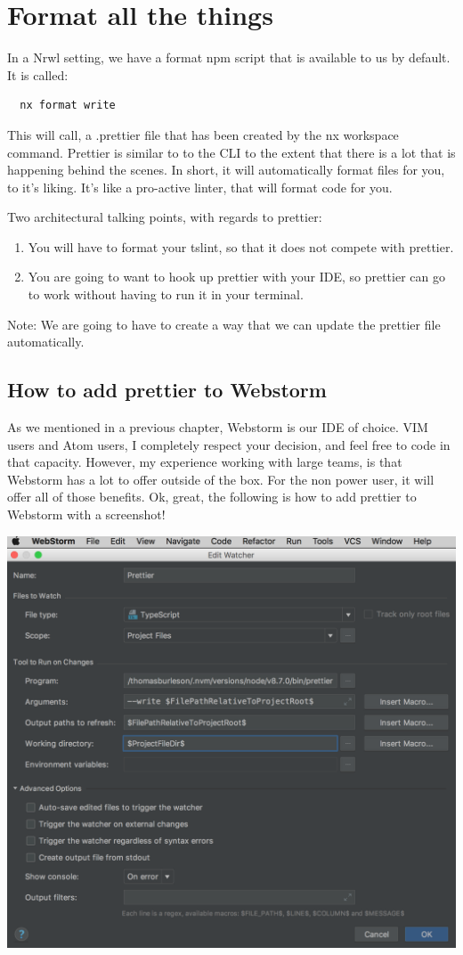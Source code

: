 
\chapter{ Format all the things }

In a Nrwl setting, we have a format npm script that is available to us by default.
It is called:

\begin{verbatim}
  nx format write
\end{verbatim}

This will call, a .prettier file that has been created by the nx workspace
command. Prettier is similar to to the CLI to the extent that there is a lot
that is happening behind the scenes. In short, it will automatically format files
for you, to it's liking. It's like a pro-active linter, that will format code
for you.

Two architectural talking points, with regards to prettier:
\begin{enumerate}
  \item You will have to format your tslint, so that it does not compete with prettier.
  \item You are going to want to hook up prettier with your IDE, so prettier
  can go to work without having to run it in your terminal.
\end{enumerate}

Note: We are going to have to create a way that we can update the prettier file
automatically.

\section{ How to add prettier to Webstorm }
As we mentioned in a previous chapter, Webstorm is our IDE of choice. VIM users
and Atom users, I completely respect your decision, and feel free to code in
that capacity. However, my experience working with large teams, is  that Webstorm
has a lot to offer outside of the box. For the non power user, it will offer
all of those benefits. Ok, great, the following is how to add prettier to Webstorm
with a screenshot!

\includegraphics[scale=0.5]{linting/format-all-the-things/prettier-file-watcher-webstorm}

